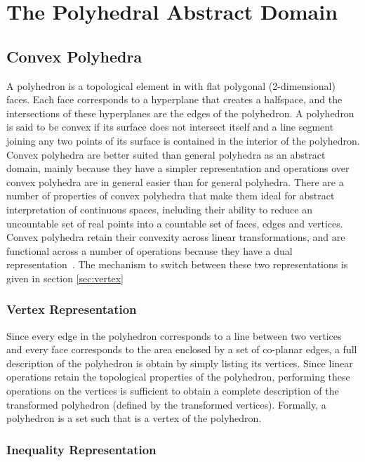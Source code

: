 \documentclass{IEEEtran}
\begin{document}
\section{The Polyhedral Abstract Domain} \label{sec:polyhedra}


\subsection{Convex Polyhedra} \label{sec:convex_polyhedra}


A polyhedron is a topological element in  with flat polygonal (2-dimensional) faces. Each 
face corresponds to a hyperplane that creates a halfspace, and the intersections of these hyperplanes are the edges of the polyhedron.
A polyhedron is said to be convex if its surface does not intersect itself and a line segment joining any two 
points of its surface is contained in the interior of the polyhedron. Convex polyhedra are better suited than
general polyhedra as an abstract domain, mainly because they have a simpler representation and operations
over convex polyhedra are in general easier than for general polyhedra.
There are a number of properties of convex polyhedra that make them ideal for abstract interpretation of
continuous spaces, including their ability to reduce an uncountable set of real points into a countable set
of faces, edges and vertices.
Convex polyhedra retain their convexity across linear transformations, and are functional across a number
of operations because they have a dual representation~\cite{fukuda1996double}. The mechanism to switch between these two
representations is given in section \ref{sec:vertex}

\subsubsection{Vertex Representation} \label{sec:vertex_representation}
Since every edge in the polyhedron corresponds to a line between two vertices and every face corresponds to
the area enclosed by a set of co-planar edges, a full description of the polyhedron is obtain by simply listing its 
vertices.
Since linear operations retain the topological properties of the polyhedron, performing these operations on the
vertices is sufficient to obtain a complete description of the transformed polyhedron (defined by the transformed
vertices).
Formally, a polyhedron is a set  such that  is a vertex of the polyhedron. 

\subsubsection{Inequality Representation} \label{sec:ine_representation}
\end{document}
